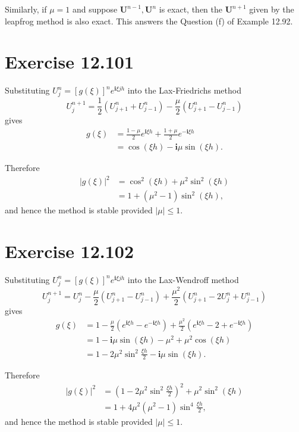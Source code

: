 \documentclass[twocolumn,10pt]{article}
\begin{document}
Similarly, if $\mu=1$ and suppose $\mathbf{U}^{n-1}, \mathbf{U}^n$ is exact, then the $\mathbf{U}^{n+1}$ given by the leapfrog method is also exact. This answers the Question (f) of Example 12.92.

\section*{\large Exercise 12.101}

Substituting $U_j^n=[g(\xi)]^ne^{\mathbf{i}\xi jh}$ into the Lax-Friedrichs method
\begin{equation*}
    U_j^{n+1}=\frac{1}{2}(U_{j+1}^n+U_{j-1}^n)-\frac{\mu}{2}(U_{j+1}^n-U_{j-1}^n)
\end{equation*}
gives
\begin{align*}
    g(\xi)&=\frac{1-\mu}{2}e^{\mathbf{i}\xi h} + \frac{1+\mu}{2}e^{-\mathbf{i}\xi h}\\
    &= \cos(\xi h) - \mathbf{i}\mu \sin(\xi h).
\end{align*}

Therefore
\begin{align*}
    |g(\xi)|^2&= \cos^2(\xi h) + \mu^2 \sin^2(\xi h)\\
    &= 1+(\mu^2-1)\sin^2(\xi h),
\end{align*}
and hence the method is stable provided $|\mu|\leq 1$.

\section*{\large Exercise 12.102}

Substituting $U_j^n=[g(\xi)]^ne^{\mathbf{i}\xi jh}$ into the Lax-Wendroff method
\begin{equation*}
    U_j^{n+1}=U_j^n - \frac{\mu}{2}(U_{j+1}^n-U_{j-1}^n) + \frac{\mu^2}{2}(U_{j+1}^n-2U_j^n+U_{j-1}^n)
\end{equation*}
gives
\begin{align*}
    g(\xi)&=1 - \frac{\mu}{2}(e^{\mathbf{i}\xi h}-e^{-\mathbf{i}\xi h}) + \frac{\mu^2}{2}(e^{\mathbf{i}\xi h}-2+e^{-\mathbf{i}\xi h})\\
    &= 1-\mathbf{i}\mu \sin(\xi h)-\mu^2+\mu^2\cos(\xi h)\\
    &= 1-2\mu^2\sin^2\frac{\xi h}{2} -\mathbf{i}\mu \sin(\xi h).
\end{align*}

Therefore
\begin{align*}
    |g(\xi)|^2&= \left(1-2\mu^2\sin^2\frac{\xi h}{2}\right)^2 + \mu^2 \sin^2(\xi h)\\
    &= 1+4\mu^2(\mu^2-1)\sin^4\frac{\xi h}{2},
\end{align*}
and hence the method is stable provided $|\mu|\leq 1$.
\end{document}
